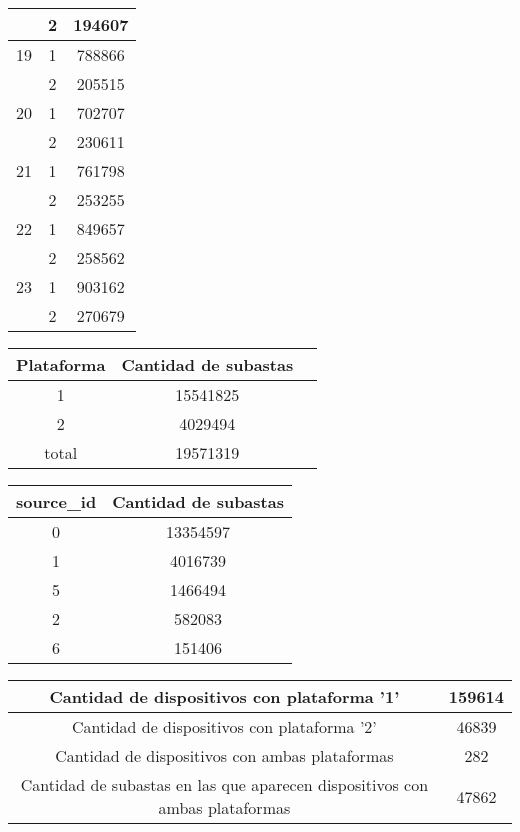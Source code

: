 \begin{center}
\begin{tabular}{ |c|c|c| }
			&	2	& 	194607 \\
		\hline
		19 	&	1	& 	788866 \\
			&	2	& 	205515 \\
		\hline
		20 	&	1	& 	702707 \\
			&	2	& 	230611 \\
		\hline
		21	&	1	& 	761798 \\
			&	2	& 	253255 \\
		\hline
		22 	&	1	& 	849657 \\
			&	2	& 	258562 \\
		\hline
		23 	&	1	& 	903162 \\
			&	2	& 	270679 \\
        \hline
	\end{tabular}
	
	\begin{tabular}{ |c|c|c| }
    	\hline
    	Plataforma	&	Cantidad de subastas \\
    	\hline\hline
    	1			&	15541825 \\
    	\hline
    	2			&	4029494	\\
    	\hline
    	total		&	19571319 \\
    	\hline
    \end{tabular}

	\begin{tabular}{ |c|c| }
    	\hline
    	source\_id	&	Cantidad de subastas \\
    	\hline\hline
    	0	&	13354597 \\
    	\hline
		1	&   4016739 \\
		\hline
		5	&   1466494 \\
		\hline
		2	&	582083 \\
		\hline
		6	&   151406\\
		\hline
    \end{tabular}
	
	\begin{tabular}{ |c|c| }
    	\hline
    	Cantidad de dispositivos con plataforma '1'	& 159614 \\
    	\hline
    	Cantidad de dispositivos con plataforma '2'	& 46839 \\
    	\hline
		Cantidad de dispositivos con ambas plataformas & 282 \\
		\hline
		Cantidad de subastas en las que aparecen dispositivos con ambas plataformas & 47862 \\
		\hline
    \end{tabular}

 	
\end{center}